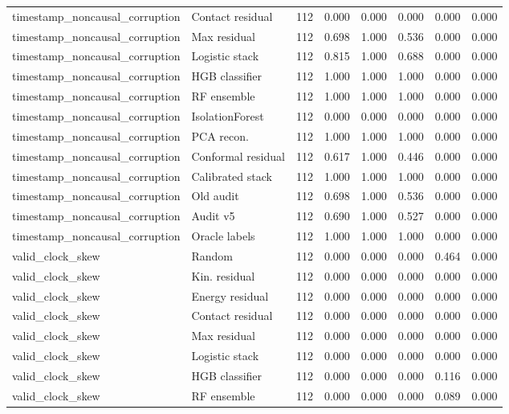 {\begin{longtable}{llrrrrrr}
timestamp\_noncausal\_corruption & Contact residual & 112 & 0.000 & 0.000 & 0.000 & 0.000 & 0.000 \\
timestamp\_noncausal\_corruption & Max residual & 112 & 0.698 & 1.000 & 0.536 & 0.000 & 0.000 \\
timestamp\_noncausal\_corruption & Logistic stack & 112 & 0.815 & 1.000 & 0.688 & 0.000 & 0.000 \\
timestamp\_noncausal\_corruption & HGB classifier & 112 & 1.000 & 1.000 & 1.000 & 0.000 & 0.000 \\
timestamp\_noncausal\_corruption & RF ensemble & 112 & 1.000 & 1.000 & 1.000 & 0.000 & 0.000 \\
timestamp\_noncausal\_corruption & IsolationForest & 112 & 0.000 & 0.000 & 0.000 & 0.000 & 0.000 \\
timestamp\_noncausal\_corruption & PCA recon. & 112 & 1.000 & 1.000 & 1.000 & 0.000 & 0.000 \\
timestamp\_noncausal\_corruption & Conformal residual & 112 & 0.617 & 1.000 & 0.446 & 0.000 & 0.000 \\
timestamp\_noncausal\_corruption & Calibrated stack & 112 & 1.000 & 1.000 & 1.000 & 0.000 & 0.000 \\
timestamp\_noncausal\_corruption & Old audit & 112 & 0.698 & 1.000 & 0.536 & 0.000 & 0.000 \\
timestamp\_noncausal\_corruption & Audit v5 & 112 & 0.690 & 1.000 & 0.527 & 0.000 & 0.000 \\
timestamp\_noncausal\_corruption & Oracle labels & 112 & 1.000 & 1.000 & 1.000 & 0.000 & 0.000 \\
valid\_clock\_skew & Random & 112 & 0.000 & 0.000 & 0.000 & 0.464 & 0.000 \\
valid\_clock\_skew & Kin. residual & 112 & 0.000 & 0.000 & 0.000 & 0.000 & 0.000 \\
valid\_clock\_skew & Energy residual & 112 & 0.000 & 0.000 & 0.000 & 0.000 & 0.000 \\
valid\_clock\_skew & Contact residual & 112 & 0.000 & 0.000 & 0.000 & 0.000 & 0.000 \\
valid\_clock\_skew & Max residual & 112 & 0.000 & 0.000 & 0.000 & 0.000 & 0.000 \\
valid\_clock\_skew & Logistic stack & 112 & 0.000 & 0.000 & 0.000 & 0.000 & 0.000 \\
valid\_clock\_skew & HGB classifier & 112 & 0.000 & 0.000 & 0.000 & 0.116 & 0.000 \\
valid\_clock\_skew & RF ensemble & 112 & 0.000 & 0.000 & 0.000 & 0.089 & 0.000 \\

\end{longtable}}
